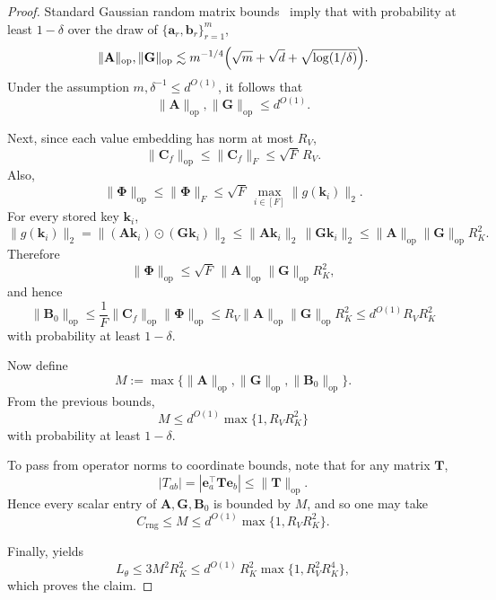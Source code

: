 \begin{proof}
Standard Gaussian random matrix bounds~\citep{vershynin2018high} imply that with probability at least $1-\delta$ over the draw of \(\{\mathbf{a}_r,\mathbf{b}_r\}_{r=1}^m\),
\[
\|\mathbf{A}\|_{\mathrm{op}},\|\mathbf{G}\|_{\mathrm{op}}
\lesssim
m^{-1/4}\Bigl(\sqrt m+\sqrt d+\sqrt{\log(1/\delta)}\Bigr).
\]
Under the assumption $m,\delta^{-1}\le d^{O(1)}$, it follows that
\[
\|\mathbf{A}\|_{\mathrm{op}},\|\mathbf{G}\|_{\mathrm{op}} \le d^{O(1)}.
\]

Next, since each value embedding has norm at most $R_{V}$,
\[
\|\mathbf{C}_{f}\|_{\mathrm{op}}\le \|\mathbf{C}_{f}\|_{F} \le \sqrt{F}\,R_{V}.
\]
Also,
\[
\|\boldsymbol{\Phi}\|_{\mathrm{op}}
\le
\|\boldsymbol{\Phi}\|_{F}
\le
\sqrt{F}\,\max_{i\in[F]}\|g(\mathbf{k}_{i})\|_{2}.
\]
For every stored key $\mathbf{k}_{i}$,
\[
\|g(\mathbf{k}_{i})\|_{2}
=
\bigl\|(\mathbf{A}\mathbf{k}_{i})\odot(\mathbf{G}\mathbf{k}_{i})\bigr\|_{2}
\le
\|\mathbf{A}\mathbf{k}_{i}\|_{2}\,\|\mathbf{G}\mathbf{k}_{i}\|_{2}
\le
\|\mathbf{A}\|_{\mathrm{op}}\|\mathbf{G}\|_{\mathrm{op}}R_{K}^2.
\]
Therefore
\[
\|\boldsymbol{\Phi}\|_{\mathrm{op}}
\le
\sqrt{F}\,\|\mathbf{A}\|_{\mathrm{op}}\|\mathbf{G}\|_{\mathrm{op}}R_{K}^2,
\]
and hence
\[
\|\mathbf{B}_{0}\|_{\mathrm{op}}
\le
\frac{1}{F}\|\mathbf{C}_{f}\|_{\mathrm{op}}\|\boldsymbol{\Phi}\|_{\mathrm{op}}
\le
R_{V}\|\mathbf{A}\|_{\mathrm{op}}\|\mathbf{G}\|_{\mathrm{op}}R_{K}^2
\le
d^{O(1)}R_VR_{K}^2
\]
with probability at least \(1-\delta\).

Now define
\[
M:=\max\{\|\mathbf{A}\|_{\mathrm{op}},\|\mathbf{G}\|_{\mathrm{op}},\|\mathbf{B}_{0}\|_{\mathrm{op}}\}.
\]
From the previous bounds,
\[
M \le d^{O(1)}\max\{1,R_VR_{K}^2\}
\]
with probability at least \(1-\delta\).

To pass from operator norms to coordinate bounds, note that for any matrix $\mathbf{T}$,
\[
|T_{ab}| = |\mathbf{e}_{a}^\top \mathbf{T} \mathbf{e}_{b}| \le \|\mathbf{T}\|_{\mathrm{op}}.
\]
Hence every scalar entry of $\mathbf{A},\mathbf{G},\mathbf{B}_{0}$ is bounded by $M$, and so one may take
\[
C_{\mathrm{rng}}\le M \le d^{O(1)}\max\{1,R_VR_{K}^2\}.
\]

Finally,  yields
\[
L_\theta \le 3M^2R_{K}^2
\le
d^{O(1)}\,R_{K}^2\max\{1,R_{V}^2R_{K}^4\},
\]
which proves the claim.
\end{proof}



